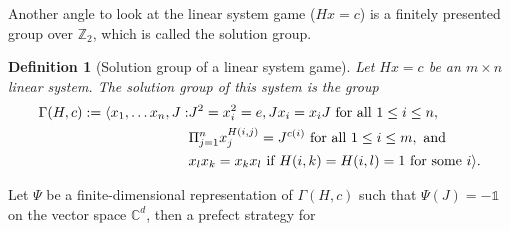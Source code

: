 \documentclass[11pt,letterpaper]{article}
\DeclarePairedDelimiter{\ip}{\langle}{\rangle}
\newcommand{\C}{\mathbb{C}}
\newcommand{\Z}{\mathbb{Z}}
\newcommand{\calH}{\mathcal{H}}
\newcommand{\1}{\mathbb{1}}
\def\carl#1{{\color{blue} #1 -Carl}}
\newcommand{\hf}[1]{\textcolor{red}{#1}}
\newtheorem{definition}[theorem]{Definition}
\theoremstyle{definition}
\begin{document}
Another angle to look at the linear system game ($Hx = c$) is a finitely presented group
over $\Z_2$, which is called the solution group.
\begin{definition}[Solution group of a linear system game]
	\label{def:presentation}
	Let $Hx = c$ be an $m \times n$  linear system. The solution group of this system
	is the group
	\begin{align*}
		\Gamma(H,c) := \ip{
		x_1,\dots x_n, J: &J^2 = x_i^2 = e, Jx_i = x_iJ \text{ for all }1 \leq i \leq n, \\
				& \Pi_{j=1}^n x_j^{H(i,j)} = J^{c(i)} \text{ for all } 1 \leq i \leq m, \text{ and } \\
				& x_l x_k = x_k x_l \text{ if } H(i,k) = H(i,l) = 1 \text{ for some } i
				} .
	\end{align*}
\end{definition}
Let $\Psi$ be a finite-dimensional representation of $\Gamma(H,c)$ such that $\Psi(J) = -\1$ on the vector space $\C^d$, then a prefect strategy for 
\end{document}
